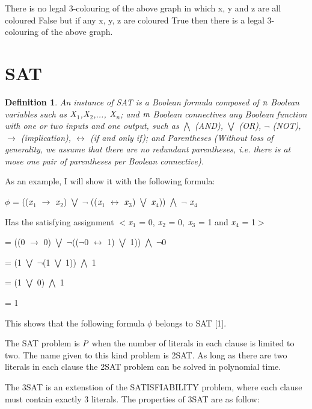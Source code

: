 \documentclass[a4paper]{report}
\newtheorem{defi}{Definition}
\begin{document}
There is no legal 3-colouring of the above graph in which x, y and z are all coloured False but if any x, y, z are coloured True then there is a legal 3-colouring of the above graph.



\section{SAT}

\begin{defi}
An instance of SAT is a Boolean formula composed of $\emph{n}$ Boolean variables such as $\emph{X}$$_{1}$,$\emph{X}$$_{2}$,..., $\emph{X}$$_{n}$; and $\emph{m}$ Boolean connectives any Boolean function with one or two inputs and one output, such as $\bigwedge$ (AND), $\bigvee$ (OR), $\neg$ (NOT), $\rightarrow$ (implication), $\leftrightarrow$ (if and only if); and Parentheses (Without loss of generality, we assume that there are no redundant parentheses, i.e. there is at mose one pair of parentheses per Boolean connective).
\end{defi}

As an example, I will show it with the following formula:

$\phi$ = (($\emph{x}$$_{1}$ $\rightarrow$ $\emph{x}$$_{2}$) $\bigvee$ $\neg$ (($\emph{x}$$_{1}$ $\leftrightarrow$ $\emph{x}$$_{3}$) $\bigvee$ $\emph{x}$$_{4}$)) $\bigwedge$ $\neg$ $\emph{x}$$_{4}$


Has the satisfying assignment $<$$\emph{x}$$_{1}$ = 0, $\emph{x}$$_{2}$ = 0, $\emph{x}$$_{3}$ = 1 and $\emph{x}$$_{4}$ = 1$>$

= ((0 $\rightarrow$ 0) $\bigvee$ $\neg$(($\neg$0 $\leftrightarrow$ 1) $\bigvee$ 1)) $\bigwedge$ $\neg$0

= (1 $\bigvee$ $\neg$(1 $\bigvee$ 1)) $\bigwedge$ 1

= (1 $\bigvee$ 0) $\bigwedge$ 1

= 1


This shows that the following formula $\phi$ belongs to SAT [1].

\vspace{3mm}
The SAT problem is $\emph{P}$ when the number of literals in each clause is limited to two. The name given to this kind problem is 2SAT. As long as there are two literals in each clause the 2SAT problem can be solved in polynomial time.

\vspace{3mm}
The 3SAT is an extenstion of the SATISFIABILITY problem, where each clause must contain exactly 3 literals. The properties of 3SAT are as follow:
\end{document}
